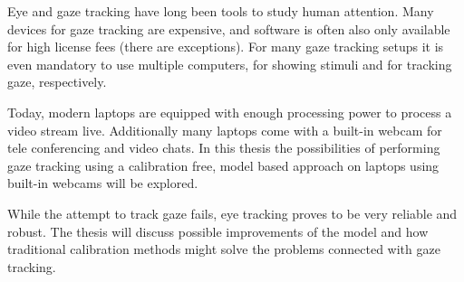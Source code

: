 Eye and gaze tracking have long been tools to study human attention. Many
devices for gaze tracking are expensive, and software is often also only
available for high license fees (there are exceptions). For many gaze tracking
setups it is even mandatory to use multiple computers, for showing stimuli and
for tracking gaze, respectively.

Today, modern laptops are equipped with enough processing power to process a
video stream live. Additionally many laptops come with a built-in webcam for
tele conferencing and video chats. In this thesis the possibilities of
performing gaze tracking using a calibration free, model based approach on
laptops using built-in webcams will be explored.

While the attempt to track gaze fails, eye tracking proves to be very reliable
and robust. The thesis will discuss possible improvements of the model and how
traditional calibration methods might solve the problems connected with gaze
tracking.
